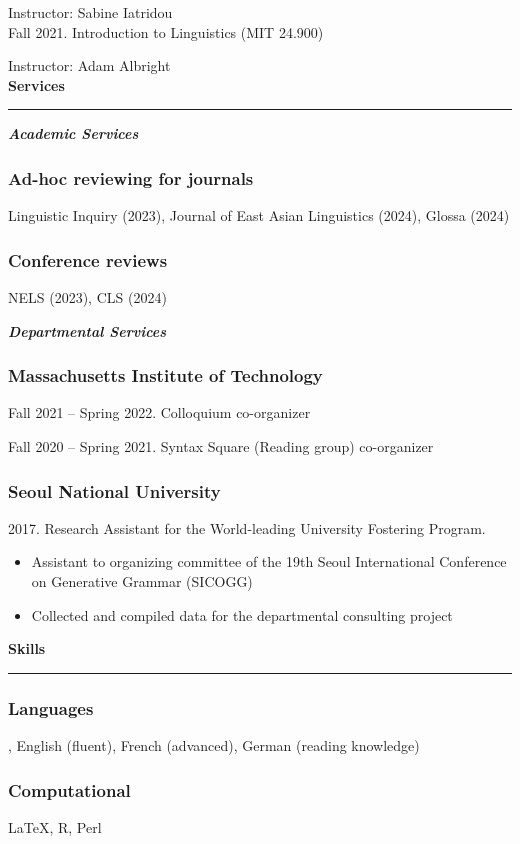 \documentclass[11pt]{article}
\newcommand{\sect}[1]{{\fontsize{15}{25}\selectfont \textbf{#1}} {\vspace{0.1cm}} \hrule {\vspace{0.3cm}}}
\newcommand{\subsect}[1]{{\fontsize{12}{18}\selectfont \textit{\textbf{#1}}} {\vspace{0.3cm}}}
\begin{document}
{\hphantom{Spring 2022.}} Instructor: Sabine Iatridou\\

Fall 2021. Introduction to Linguistics (MIT 24.900)

{\hphantom{Fall 2021.}} Instructor: Adam Albright\\

\sect{Services}

\subsect{Academic Services}

\vspace{-0.75cm}

\subsubsection*{Ad-hoc reviewing for journals}

Linguistic Inquiry (2023), Journal of East Asian Linguistics (2024), Glossa (2024)

\subsubsection*{Conference reviews}

NELS (2023), CLS (2024)

\vspace{\baselineskip}

\subsect{Departmental Services}

\vspace{-0.75cm}

\subsubsection*{Massachusetts Institute of Technology}
Fall 2021 -- Spring 2022. Colloquium co-organizer

Fall 2020 -- Spring 2021. Syntax Square (Reading group) co-organizer

\subsubsection*{Seoul National University}
{2017. Research Assistant for the World-leading University Fostering Program.

\begin{itemize}[leftmargin=15pt, topsep=0pt, itemsep=0pt, parsep=0pt]
	\item{{\small Assistant to organizing committee of the 19th Seoul International Conference on Generative Grammar (SICOGG)}}
	\item{{\small Collected and compiled data for the departmental consulting project}}
\end{itemize}
}

\vspace{1cm}

\sect{Skills}

\subsubsection*{Languages}
, English (fluent), French (advanced), German (reading knowledge)
\subsubsection*{Computational}
 {\LaTeX}, R, Perl
\end{document}
